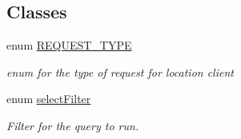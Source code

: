\subsection*{Classes}
\begin{DoxyCompactItemize}
\item 
enum \hyperlink{enumuk_1_1ac_1_1swan_1_1digitaltrails_1_1activities_1_1_map_activity_1_1_r_e_q_u_e_s_t___t_y_p_e}{R\+E\+Q\+U\+E\+S\+T\+\_\+\+T\+Y\+P\+E}
\begin{DoxyCompactList}\small\item\em enum for the type of request for location client \end{DoxyCompactList}\item 
enum \hyperlink{enumuk_1_1ac_1_1swan_1_1digitaltrails_1_1activities_1_1_map_activity_1_1select_filter}{select\+Filter}
\begin{DoxyCompactList}\small\item\em Filter for the query to run. \end{DoxyCompactList}\end{DoxyCompactItemize}
